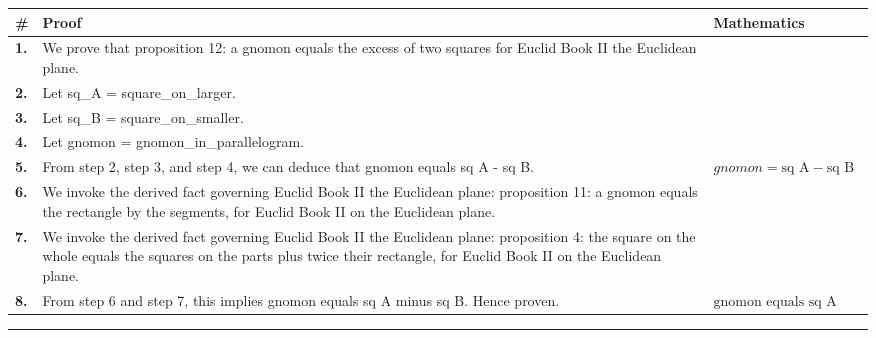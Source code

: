 \documentclass[11pt]{article}
\theoremstyle{definition}
\begin{document}
\begin{tabular}{@{} >{\raggedright\arraybackslash}p{} >{\raggedright\arraybackslash}p{} >{\raggedleft\arraybackslash}p{} @{}}
\textbf{\#} & \textbf{Proof} & \textbf{Mathematics} \\
\midrule
\textbf{1.} & We prove that proposition 12: a gnomon equals the excess of two squares for Euclid Book II the Euclidean plane. & \\[0.45em]
\textbf{2.} & Let sq\_A = square\_on\_larger. & \\[0.45em]
\textbf{3.} & Let sq\_B = square\_on\_smaller. & \\[0.45em]
\textbf{4.} & Let gnomon = gnomon\_in\_parallelogram. & \\[0.45em]
\textbf{5.} & From step 2, step 3, and step 4, we can deduce that gnomon equals sq A - sq B. & $\displaystyle gnomon = \text{sq A} - \text{sq B}$ \\[0.45em]
\textbf{6.} & We invoke the derived fact governing Euclid Book II the Euclidean plane: proposition 11: a gnomon equals the rectangle by the segments, for Euclid Book II on the Euclidean plane. & \\[0.45em]
\textbf{7.} & We invoke the derived fact governing Euclid Book II the Euclidean plane: proposition 4: the square on the whole equals the squares on the parts plus twice their rectangle, for Euclid Book II on the Euclidean plane. & \\[0.45em]
\textbf{8.} & From step 6 and step 7, this implies gnomon equals sq A minus sq B. Hence proven. & $\displaystyle \text{gnomon equals sq A minus sq B}$ \\[0.45em]
\bottomrule
\end{tabular}
\label{thm:Geometry-Euclid Book II-proposition_12_a_gnomon_equals_the_excess_of_two_squares}
\par\medskip\hrule
\end{document}
